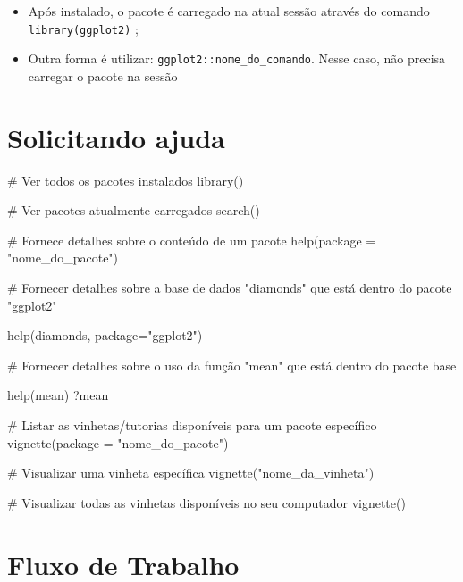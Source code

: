 \documentclass[
  letterpaper,
  DIV=11,
  numbers=noendperiod]{scrartcl}
\newenvironment{Shaded}{\begin{snugshade}}{\end{snugshade}}
\newcommand{\AttributeTok}[1]{\textcolor[rgb]{0.40,0.45,0.13}{#1}}
\newcommand{\CommentTok}[1]{\textcolor[rgb]{0.37,0.37,0.37}{#1}}
\newcommand{\FunctionTok}[1]{\textcolor[rgb]{0.28,0.35,0.67}{#1}}
\newcommand{\NormalTok}[1]{\textcolor[rgb]{0.00,0.23,0.31}{#1}}
\newcommand{\StringTok}[1]{\textcolor[rgb]{0.13,0.47,0.30}{#1}}
\begin{document}
\begin{itemize}
\item
  Após instalado, o pacote é carregado na atual sessão através do
  comando \texttt{library(ggplot2)} ;
\item
  Outra forma é utilizar: \texttt{ggplot2::nome\_do\_comando}. Nesse
  caso, não precisa carregar o pacote na sessão
\end{itemize}

\section{Solicitando ajuda}\label{solicitando-ajuda}

\begin{Shaded}
\begin{Highlighting}[]
\CommentTok{\# Ver todos os pacotes instalados}
\FunctionTok{library}\NormalTok{()}

\CommentTok{\# Ver pacotes atualmente carregados}
\FunctionTok{search}\NormalTok{()}

\CommentTok{\# Fornece detalhes sobre o conteúdo de um pacote}
\FunctionTok{help}\NormalTok{(}\AttributeTok{package =} \StringTok{"nome\_do\_pacote"}\NormalTok{)}

\CommentTok{\# Fornecer detalhes sobre a base de dados "diamonds" que está dentro do pacote "ggplot2"}

\FunctionTok{help}\NormalTok{(diamonds, }\AttributeTok{package=}\StringTok{"ggplot2"}\NormalTok{)}

\CommentTok{\# Fornecer detalhes sobre o uso da função "mean" que está dentro do pacote base}

\FunctionTok{help}\NormalTok{(mean)}
\NormalTok{?mean}

\CommentTok{\# Listar as vinhetas/tutorias disponíveis para um pacote específico}
\FunctionTok{vignette}\NormalTok{(}\AttributeTok{package =} \StringTok{"nome\_do\_pacote"}\NormalTok{)}

\CommentTok{\# Visualizar uma vinheta específica}
\FunctionTok{vignette}\NormalTok{(}\StringTok{"nome\_da\_vinheta"}\NormalTok{)}

\CommentTok{\# Visualizar todas as vinhetas disponíveis no seu computador}
\FunctionTok{vignette}\NormalTok{()}
\end{Highlighting}
\end{Shaded}

\section{Fluxo de Trabalho}\label{fluxo-de-trabalho}
\end{document}
